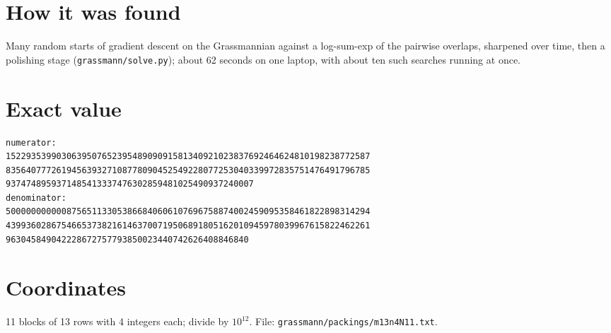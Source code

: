 \documentclass[11pt,a4paper]{article}
\begin{document}
\section{How it was found}
Many random starts of gradient descent on the Grassmannian against a log-sum-exp of the pairwise overlaps, sharpened over time, then a polishing stage (\texttt{grassmann/solve.py}); about 62 seconds on one laptop, with about ten such searches running at once.


\appendix
\section{Exact value}
{\small
\begin{verbatim}
numerator:
152293539903063950765239548909091581340921023837692464624810198238772587
835640777261945639327108778090452549228077253040339972835751476491796785
9374748959371485413337476302859481025490937240007
denominator:
500000000000875651133053866840606107696758874002459095358461822898314294
439936028675466537382161463700719506891805162010945978039967615822462261
963045849042228672757793850023440742626408846840
\end{verbatim}}

\section{Coordinates}
11 blocks of 13 rows with 4 integers each; divide by $10^{12}$. File: \texttt{grassmann/packings/m13n4N11.txt}.
{\tiny
\begin{multicols}{3}
\end{multicols}}
\end{document}
